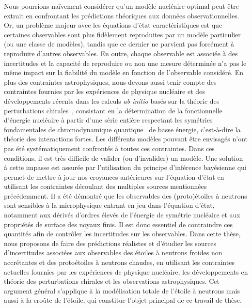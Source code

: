 Nous pourrions naïvement considérer qu'un modèle nucléaire optimal peut être 
extrait en confrontant les prédictions théoriques aux données 
observationnelles. Or, un problème majeur avec les équations d'état 
caractéristiques est que certaines observables sont plus fidèlement reproduites 
par un modèle particulier (ou une classe de modèles), tandis que ce dernier ne
parvient pas forcément à reproduire d'autres observables. 
En outre, chaque observable est associée à des incertitudes et la capacité de 
reproduire ou non une mesure déterminée n'a pas le même impact sur la 
fiabilité du modèle en fonction de l'observable considéré. 
En plus des contraintes astrophysiques, nous devons aussi tenir compte des 
contraintes fournies par les expériences de physique nucléaire et des 
développements récents dans les calculs \textit{ab initio} basés sur la théorie 
des perturbations chirales~\cite{Drischler2016}, consistant en la détermination 
de la fonctionnelle d'énergie nucléaire à partir d'une série entière respectant 
les symétries fondamentales de chromodynamique quantique~\cite{Machleidt2011} 
de basse énergie, c'est-à-dire la théorie des interactions fortes. 
Les différents modèles pouvant être envisagés n'ont pas été systématiquement 
confrontés à toutes ces contraintes. Dans ces conditions, il est très 
difficile de valider (ou d'invalider) un modèle. Une solution à cette impasse 
est assurée par l'utilisation du principe d'inférence bayésienne qui permet de 
mettre à jour nos croyances antérieures sur l'équation d'état en utilisant
les contraintes découlant des multiples sources mentionnées précédemment.
%
Il a été démontré que les observables des (proto)étoiles à neutrons sont 
sensibles à la microphysique entrant en jeu dans l'équation d'état, notamment 
aux dérivés d'ordres élevés de l'énergie de symétrie nucléaire et aux 
propriétés de surface des noyaux finis. 
Il est donc essentiel de contraindre ces quantités afin de contrôler les 
incertitudes sur les observables. 
Dans cette thèse, nous proposons de faire des prédictions réalistes et 
d'étudier les sources d'incertitudes associées aux observables des étoiles à
neutrons froides non accrétantes et des protoétoiles à neutrons chaudes, en 
utilisant les contraintes actuelles fournies par les expériences de physique 
nucléaire, les développements en théorie des perturbations chirales et les 
observations astrophysiques. 
Cet argument général s'applique à la modélisation totale de l'étoile à
neutrons mais aussi à la croûte de l'étoile, qui constitue l'objet principal de 
ce travail de thèse.

